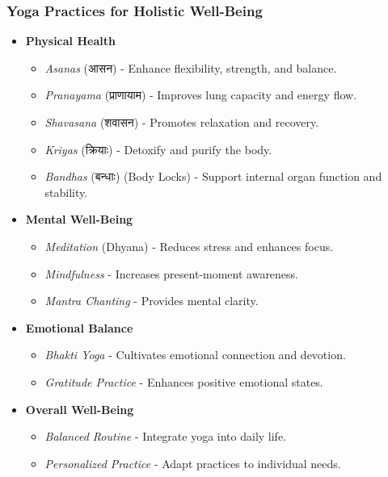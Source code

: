 \begin{frame}[fragile]\frametitle{Yoga Practices for Holistic Well-Being}

	\begin{itemize} 
	\item \textbf{Physical Health} 
		\begin{itemize} 
			\item \textit{Asanas} (आसन) - Enhance flexibility, strength, and balance. 
			\item \textit{Pranayama} (प्राणायाम) - Improves lung capacity and energy flow. 
			\item \textit{Shavasana} (शवासन) - Promotes relaxation and recovery. 
			\item \textit{Kriyas} (क्रियाः) - Detoxify and purify the body. 
			\item \textit{Bandhas} (बन्धाः) (Body Locks) - Support internal organ function and stability.
		\end{itemize}

	\item \textbf{Mental Well-Being}
		\begin{itemize}
			\item \textit{Meditation} (Dhyana) - Reduces stress and enhances focus.
			\item \textit{Mindfulness} - Increases present-moment awareness.
			\item \textit{Mantra Chanting} - Provides mental clarity.
		\end{itemize}

	\item \textbf{Emotional Balance}
		\begin{itemize}
			\item \textit{Bhakti Yoga} - Cultivates emotional connection and devotion.
			\item \textit{Gratitude Practice} - Enhances positive emotional states.
		\end{itemize}

	\item \textbf{Overall Well-Being}
		\begin{itemize}
			\item \textit{Balanced Routine} - Integrate yoga into daily life.
			\item \textit{Personalized Practice} - Adapt practices to individual needs.
		\end{itemize}
	\end{itemize}

\end{frame}


